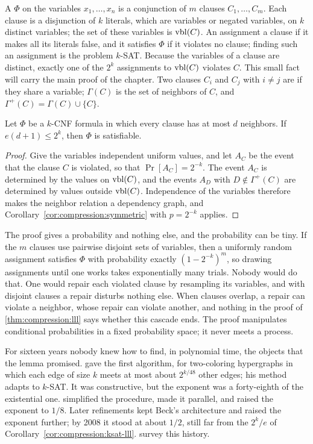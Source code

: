 \begin{refsection}
A  $\Phi$ on the variables $x_1,\dots,x_n$ is a conjunction of $m$ clauses $C_1,\dots,C_m$. Each clause is a disjunction of $k$ literals, which are variables or negated variables, on $k$ distinct variables; the set of these variables is $\operatorname{vbl}(C)$. An assignment  a clause if it makes all its literals false, and it satisfies $\Phi$ if it violates no clause; finding such an assignment is the problem $k$-SAT. Because the variables of a clause are distinct, exactly one of the $2^k$ assignments to $\operatorname{vbl}(C)$ violates $C$. This small fact will carry the main proof of the chapter. Two clauses $C_i$ and $C_j$ with $i\ne j$ are  if they share a variable; $\Gamma(C)$ is the set of neighbors of $C$, and $\Gamma^+(C)=\Gamma(C)\cup\{C\}$.

\begin{corollary}\label{cor:compression:ksat-lll}
Let $\Phi$ be a $k$-CNF formula in which every clause has at most $d$ neighbors. If $e(d+1)\le2^k$, then $\Phi$ is satisfiable.
\end{corollary}

\begin{proof}
Give the variables independent uniform values, and let $A_C$ be the event that the clause $C$ is violated, so that $\Pr[A_C]=2^{-k}$. The event $A_C$ is determined by the values on $\operatorname{vbl}(C)$, and the events $A_D$ with $D\notin\Gamma^+(C)$ are determined by values outside $\operatorname{vbl}(C)$. Independence of the variables therefore makes the neighbor relation a dependency graph, and Corollary~\ref{cor:compression:symmetric} with $p=2^{-k}$ applies.
\end{proof}

The proof gives a probability and nothing else, and the probability can be tiny. If the $m$ clauses use pairwise disjoint sets of variables, then a uniformly random assignment satisfies $\Phi$ with probability exactly $(1-2^{-k})^m$, so drawing assignments until one works takes exponentially many trials. Nobody would do that. One would repair each violated clause by resampling its variables, and with disjoint clauses a repair disturbs nothing else. When clauses overlap, a repair can violate a neighbor, whose repair can violate another, and nothing in the proof of \cref{thm:compression:lll} says whether this cascade ends. The proof manipulates conditional probabilities in a fixed probability space; it never meets a process.

For sixteen years nobody knew how to find, in polynomial time, the objects that the lemma promised. \textcite{Beck1991} gave the first algorithm, for two-coloring hypergraphs in which each edge of size $k$ meets at most about $2^{k/48}$ other edges; his method adapts to $k$-SAT. It was constructive, but the exponent was a forty-eighth of the existential one. \textcite{Alon1991} simplified the procedure, made it parallel, and raised the exponent to $1/8$. Later refinements kept Beck's architecture and raised the exponent further; by 2008 it stood at about $1/2$, still far from the $2^k/e$ of Corollary~\ref{cor:compression:ksat-lll}. \Textcite{MoserTardos2010} survey this history.


\end{refsection}
